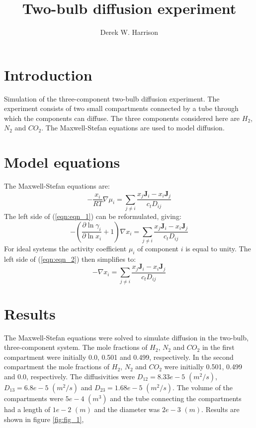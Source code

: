 \documentclass[11]{report}
\begin{document}
\author{Derek W. Harrison}
\title{Two-bulb diffusion experiment}
\maketitle

\section*{Introduction}
Simulation of the three-component two-bulb diffusion experiment. The experiment consists of two small compartments connected by a tube through which the components can diffuse. The three components considered here are $H_2$, $N_2$ and $CO_2$. The Maxwell-Stefan equations are used to model diffusion. 

\section*{Model equations}
The Maxwell-Stefan equations are:
\begin{equation}
\label{eqn:eqn_1}
-\frac{x_i}{RT} \nabla \mu_i = \sum_{j \neq i} \frac{x_j \textbf{J}_i - x_i \textbf{J}_j}{c_t D_{ij}}
\end{equation}
The left side of (\ref{eqn:eqn_1}) can be reformulated, giving:
\begin{equation}
\label{eqn:eqn_2}
-\left( \frac{\partial \ln{\gamma_i}}{\partial \ln{x_i}} + 1 \right) \nabla x_i = \sum_{j \neq i} \frac{x_j \textbf{J}_i - x_i \textbf{J}_j}{c_t D_{ij}}
\end{equation}
For ideal systems the activity coefficient $\mu_i$ of component $i$ is equal to unity. The left side of (\ref{eqn:eqn_2}) then simplifies to:
\begin{equation}
\label{eqn:eqn_3}
- \nabla x_i = \sum_{j \neq i} \frac{x_j \textbf{J}_i - x_i \textbf{J}_j}{c_t D_{ij}}
\end{equation}

\section*{Results}
The Maxwell-Stefan equations were solved to simulate diffusion in the two-bulb, three-component system. The mole fractions of $H_2$, $N_2$ and $CO_2$ in the first compartment were initially 0.0, 0.501 and 0.499, respectively. In the second compartment the mole fractions of $H_2$, $N_2$ and $CO_2$ were initially 0.501, 0.499 and 0.0, respectively. The diffusivities were $D_{12} = 8.33e-5$  $(m^2/s)$, $D_{13} = 6.8e-5$ $(m^2/s)$ and $D_{23} = 1.68e-5$ $(m^2/s)$. The volume of the compartments were $5e-4$ $(m^3)$ and the tube connecting the compartments had a length of $1e-2$ $(m)$ and the diameter was $2e-3$ $(m)$. Results are shown in figure \ref{fig:fig_1}, 
\end{document}
